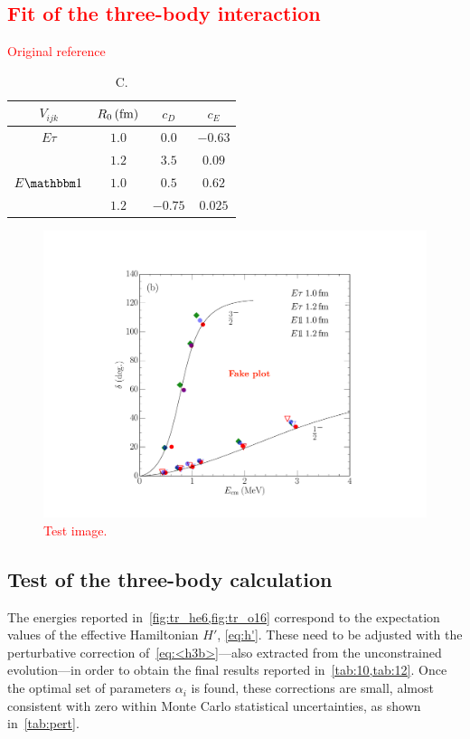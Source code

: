 \documentclass[aps,prc,twocolumn,superscriptaddress,floatfix]{revtex4-1}
\newcommand{\red}[1]{\protect\textcolor{red}{#1}}
\begin{document}
\subsection{\red{Fit of the three-body interaction}}
\red{Original reference}~\cite{Lynn:2016}

\begin{table}[htb]
\centering
\caption[]{C.}
\begin{tabular}{cccc}
\hline\hline
$V_{ijk}$    & $R_0\,(\rm fm)$ & $c_D$ & $c_E$ \\
\hline
$E\tau$      & $1.0$ & $0.0$   & $-0.63$ \\
             & $1.2$ & $3.5$   & $0.09$  \\
$E\mathbbm1$ & $1.0$ & $0.5$   & $0.62$  \\
             & $1.2$ & $-0.75$ & $0.025$ \\
\hline\hline
\end{tabular}
\label{tab:3bfit}
\end{table}

\begin{figure}[htb]
\includegraphics[width=\linewidth]{nalpha.pdf}
\caption[]{\red{Test image.}}
\label{fig:3bfit}
\end{figure}


\subsection{Test of the three-body calculation}
The energies reported in~\cref{fig:tr_he6,fig:tr_o16} correspond to the
expectation values of the effective Hamiltonian $H'$, \cref{eq:h'}. 
These need to be adjusted with the perturbative correction of~\cref{eq:<h3b>}---also extracted 
from the unconstrained evolution---in order to obtain the final results reported in~\cref{tab:10,tab:12}. 
Once the optimal set of parameters $\alpha_i$ is found, these corrections are small,
almost consistent with zero within Monte Carlo statistical uncertainties,
as shown in~\cref{tab:pert}.
\end{document}
